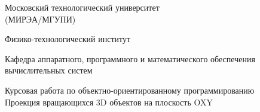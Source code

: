 \begin{titlepage}
\begin{center} %

\bfseries

	{\Large Московский технологический университет \\
	(МИРЭА/МГУПИ)
	
	} %

\vspace{48pt}


	{\large 
	  Физико-технологический институт
	}


\vspace{36pt}


	{\large  {\comic Кафедра аппаратного, программного и математического обеспечения вычислительных систем}
	
	} %

\vspace{48pt}

{\large	\DoloresCyr Курсовая работа по объектно-ориентированному программированию \\
  \LARGE{Проекция вращающихся 3D объектов на плоскость OXY}
	
	}

\vspace{12pt}


\end{center} %

\vspace{60pt}


\end{titlepage}
